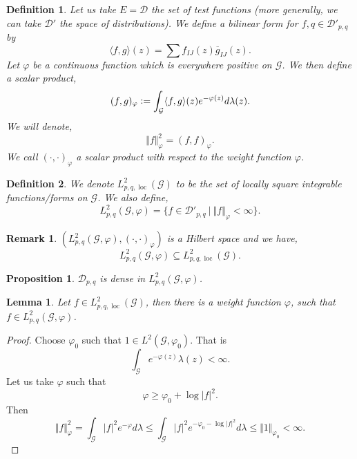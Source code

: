 \documentclass{article}
\newtheorem{proposition}{Proposition}[section]
\newtheorem{definition}{Definition}[section]
\newtheorem{lemma}{Lemma}[section]
\newtheorem{remark}{Remark}[section]
\DeclareMathOperator{\loc}{loc}
\newcommand{\defeq}{\vcentcolon=}
\newcommand{\norm}[1]{\Vert #1 \Vert}
\newcommand{\G}[0]{\mathcal{G}}
\newcommand{\sep}[0]{\:|\:}
\begin{document}
\begin{definition}
  Let us take $E=\mathcal{D}$ the set of test functions (more generally, we can take $\mathcal{D}'$ the space of distributions). We define a bilinear form for $f,q\in \mathcal{D}'_{p,q}$ by 
  \begin{equation*}
    \langle f,g\rangle(z) = \sum f_{IJ}(z)\overline{g}_{IJ}(z).
  \end{equation*}
  Let $\varphi$ be a continuous function which is everywhere positive on $\G$. We then define a scalar product,
  \begin{equation*}
    (f,g)_\varphi \defeq \int_\G \langle f,g\rangle(z)e^{-\varphi(z)}d\lambda(z).
  \end{equation*}
  We will denote,
  \begin{equation*}
    \norm{f}_\varphi^2 = (f,f)_\varphi.
  \end{equation*}
  We call $(\cdot,\cdot)_\varphi$ a scalar product with respect to the weight function $\varphi$.
\end{definition}

\begin{definition}
  We denote $L^2_{p,q,\loc}(\G)$ to be the set of locally square integrable functions/forms on $\G$. We also define,
  \begin{equation*}
    L^2_{p,q}(\G,\varphi) = \{f\in \mathcal{D}'_{p,q}\sep \norm{f}_\varphi<\infty\}.
  \end{equation*}
\end{definition}

\begin{remark}
  $(L^2_{p,q}(\G,\varphi),(\cdot,\cdot)_\varphi)$ is a Hilbert space and we have,
  \begin{equation*}
    L_{p,q}^2(\G,\varphi)\subseteq L^2_{p,q,\loc}(\G).
  \end{equation*}
\end{remark}

\begin{proposition}
  $\mathcal{D}_{p,q}$ is dense in $L^2_{p,q}(\G,\varphi)$.
\end{proposition}

\begin{lemma}
  Let $f\in L_{p,q,\loc}^2(\G)$, then there is a weight function $\varphi$, such that $f\in L_{p,q}^2(\G,\varphi)$.
\end{lemma}

\begin{proof}
  Choose $\varphi_0$ such that $1\in L^2(\G,\varphi_0)$. That is 
  \begin{equation*}
    \int_\G e^{-\varphi(z)}\lambda(z)<\infty.
  \end{equation*}
  Let us take $\varphi$ such that 
  \begin{equation*}
    \varphi\geq \varphi_0+\log\vert f\vert^2.
  \end{equation*}
  Then 
  \begin{equation*}
    \norm{f}_{\varphi}^2 = \int_\G\vert f\vert^2e^{-\varphi}d\lambda \leq \int_\G\vert f\vert^2e^{-\varphi_0-\log\vert f\vert^2}d\lambda\leq \norm{1}_{\varphi_0}<\infty.
  \end{equation*}
\end{proof}
\end{document}
